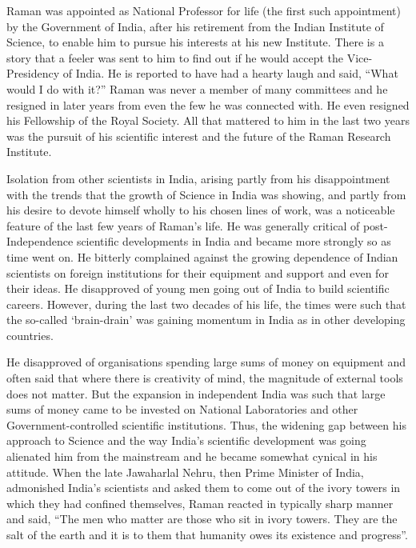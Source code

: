 Raman was appointed as National Professor for life (the first
such appointment) by the Government of India, after his retirement 
from the Indian Institute of Science, to enable him to pursue
his interests at his new Institute. There is a story that a feeler
was sent to him to find out if he would accept the Vice-Presidency
of India. He is reported to have had a hearty laugh and said,
``What would I do with it?'' Raman was never a member of many
committees and he resigned in later years from even the few he
was connected with. He even resigned his Fellowship of the Royal
Society. All that mattered to him in the last two years was the
pursuit of his scientific interest and the future of the Raman
Research Institute.

\bigskip
{}
\smallskip


\noindent
Isolation from other scientists in India, arising partly from
his disappointment with the trends that the growth of Science
in India was showing, and partly from his desire to devote himself
wholly to his chosen lines of work, was a noticeable feature of
the last few years of Raman's life. He was generally critical of
post-Independence scientific developments in India and became
more strongly so as time went on. He bitterly complained against
the growing dependence of Indian scientists on foreign institutions
for their equipment and support and even for their ideas.
He disapproved of young men going out of India to build
scientific careers. However, during the last two decades of his
life, the times were such that the so-called `brain-drain' was
gaining momentum in India as in other developing countries.


He disapproved of organisations spending large sums of\break
money on equipment and often said that where there is creativity
of mind, the magnitude of external tools does not matter. But the
expansion in independent India was such that large sums of money
came to be invested on National Laboratories and other
Government-controlled scientific institutions. Thus, the widening
gap between his approach to Science and the way India's scientific
development was going alienated him from the mainstream and
he became somewhat cynical in his attitude. When the late
Jawaharlal Nehru, then Prime Minister of India, admonished
India's scientists and asked them to come out of the ivory towers
in which they had confined themselves, Raman reacted in typically
sharp manner and said, ``The men who matter are those who
sit in ivory towers. They are the salt of the earth and it is to them
that humanity owes its existence and progress''.


